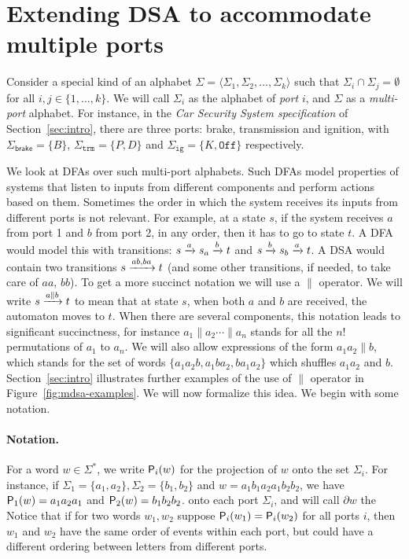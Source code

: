 \section{Extending DSA to accommodate multiple ports}
\label{sec:multiport}

Consider a special kind of an alphabet
$\Sigma = \langle \Sigma_1, \Sigma_2, \dots, \Sigma_k \rangle$ such
that $\Sigma_i \cap \Sigma_j = \emptyset$ for all $i, j \in
\{1, \dots, k\}$. We will call $\Sigma_i$ as the alphabet of \emph{port} $i$,
and $\Sigma$ as a \emph{multi-port} alphabet. For instance, in the \emph{Car Security System specification} of Section~\ref{sec:intro}, there are three ports: brake, transmission and ignition, with $\Sigma_{\mathsf{brake}} = \{B\}$, $\Sigma_{\mathtt{trm}} = \{ P, D\}$ and $\Sigma_{\mathtt{ig}} = \{ K, \mathtt{Off} \}$ respectively.  

We look at DFAs over such multi-port alphabets. Such DFAs model properties of systems 
that listen to inputs from different components and perform actions
based on them. Sometimes the order in which the system receives its
inputs from different ports is not relevant. For example, at a state
$s$, if the system receives $a$ from port 1 and $b$ from port 2, in any
order, then it has to go to state $t$.  A DFA would model this with
transitions: $s \xrightarrow{a} s_a \xrightarrow{b} t$ and $s \xrightarrow{b} s_b \xrightarrow{a}
t$. A DSA would contain two transitions $s \xrightarrow{ab, ba} t$ (and some
other transitions, if needed, to take care of $aa$, $bb$). To get a
more succinct notation we will use a $\parallel$ operator. We will
write $s \xrightarrow{a \parallel b} t$ to mean that at state $s$, when
both $a$ and $b$ are received, the automaton moves to $t$. When there
are several components, this notation leads to significant
succinctness, for instance $a_1 \parallel a_2 \cdots \parallel a_n$
stands for all the $n!$ permutations of $a_1$ to $a_n$. We will also
allow expressions of the form $a_1 a_2 \parallel b$, which stands for
the set of words $\{a_1 a_2 b, a_1 b a_2, b a_1 a_2\}$ which shuffles
$a_1a_2$ and $b$. Section~\ref{sec:intro} illustrates further examples of the use of $\parallel$ operator in Figure~\ref{fig:mdsa-examples}. We will now formalize this idea.  We begin with some notation.%

\paragraph*{Notation.} For a word $w \in \Sigma^*$, we write
$\mathsf{P}_{i}(w)$ for the projection of $w$ onto the set $\Sigma_i$. For
instance, if $\Sigma_1 = \{a_1, a_2\}, \Sigma_2 = \{b_1, b_2\}$ and
$w = a_1 b_1 a_2 a_1 b_2 b_2$, we have $\mathsf{P}_{1}(w) = a_1 a_2 a_1$ and
$\mathsf{P}_{2}(w) = b_1 b_2 b_2$.  %
onto each port $\Sigma_i$, and will call $\partial w$ the
Notice that if for two words $w_1, w_2$ suppose $\mathsf{P}_{i}(w_1) = \mathsf{P}_{i}(w_2)$ for all ports $i$, then $w_1$ and $w_2$ have the same order of events within each port, but could have a different ordering between letters from different ports.%


